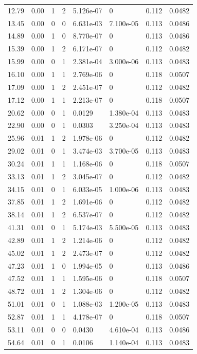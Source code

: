 \documentclass[preview]{standalone}
\begin{document}
{{\begin{tabular}{L{1.2cm}C{1.2cm} C{0.3cm}C{0.5cm} C{1.4cm}C{1.4cm} C{1.4cm}C{1.4cm}}
  12.79  &  0.00  & 1     &  2 &  5.126e-07  & 0  & 0.112 &  0.0482   \\ 
  13.45  &  0.00  & 0     &  0 &  6.631e-03  & 7.100e-05  & 0.113 &  0.0486   \\ 
  14.89  &  0.00  & 1     &  0 &  8.770e-07  & 0  & 0.113 &  0.0486   \\ 
  15.39  &  0.00  & 1     &  2 &  6.171e-07  & 0  & 0.112 &  0.0482   \\ 
  15.99  &  0.00  & 0     &  1 &  2.381e-04  & 3.000e-06  & 0.113 &  0.0483   \\ 
  16.10  &  0.00  & 1     &  1 &  2.769e-06  & 0  & 0.118 &  0.0507   \\ 
  17.09  &  0.00  & 1     &  2 &  2.451e-07  & 0  & 0.112 &  0.0482   \\ 
  17.12  &  0.00  & 1     &  1 &  2.213e-07  & 0  & 0.118 &  0.0507   \\ 
  20.62  &  0.00  & 0     &  1 &  0.0129  & 1.380e-04  & 0.113 &  0.0483   \\ 
  22.90  &  0.00  & 0     &  1 &  0.0303  & 3.250e-04  & 0.113 &  0.0483   \\ 
  25.96  &  0.01  & 1     &  2 &  1.978e-06  & 0  & 0.112 &  0.0482   \\ 
  29.02  &  0.01  & 0     &  1 &  3.474e-03  & 3.700e-05  & 0.113 &  0.0483   \\ 
  30.24  &  0.01  & 1     &  1 &  1.168e-06  & 0  & 0.118 &  0.0507   \\ 
  33.13  &  0.01  & 1     &  2 &  3.045e-07  & 0  & 0.112 &  0.0482   \\ 
  34.15  &  0.01  & 0     &  1 &  6.033e-05  & 1.000e-06  & 0.113 &  0.0483   \\ 
  37.85  &  0.01  & 1     &  2 &  1.691e-06  & 0  & 0.112 &  0.0482   \\ 
  38.14  &  0.01  & 1     &  2 &  6.537e-07  & 0  & 0.112 &  0.0482   \\ 
  41.31  &  0.01  & 0     &  1 &  5.174e-03  & 5.500e-05  & 0.113 &  0.0483   \\ 
  42.89  &  0.01  & 1     &  2 &  1.214e-06  & 0  & 0.112 &  0.0482   \\ 
  45.02  &  0.01  & 1     &  2 &  2.473e-07  & 0  & 0.112 &  0.0482   \\ 
  47.23  &  0.01  & 1     &  0 &  1.994e-05  & 0  & 0.113 &  0.0486   \\ 
  47.52  &  0.01  & 1     &  1 &  1.595e-06  & 0  & 0.118 &  0.0507   \\ 
  48.72  &  0.01  & 1     &  2 &  1.304e-06  & 0  & 0.112 &  0.0482   \\ 
  51.01  &  0.01  & 0     &  1 &  1.088e-03  & 1.200e-05  & 0.113 &  0.0483   \\ 
  52.87  &  0.01  & 1     &  1 &  4.178e-07  & 0  & 0.118 &  0.0507   \\ 
  53.11  &  0.01  & 0     &  0 &  0.0430  & 4.610e-04  & 0.113 &  0.0486   \\ 
  54.64  &  0.01  & 0     &  1 &  0.0106  & 1.140e-04  & 0.113 &  0.0483   \\ 
\hline 
\end{tabular} 

}}
\end{document}
